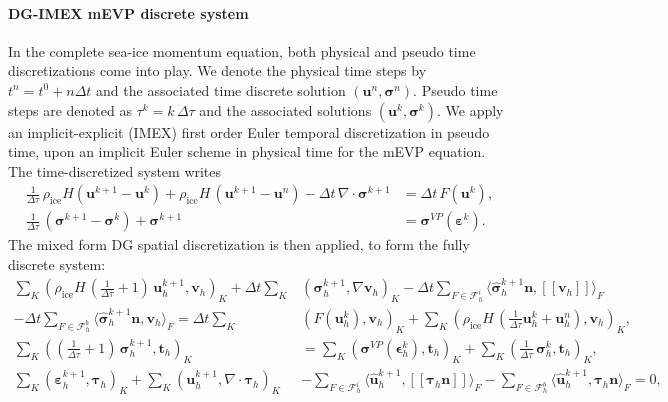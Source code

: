 \documentclass[11pt]{article}
\newcommand{\bu}{\mathbf{u}}
\newcommand{\bt}{\mathbf{t}}
\newcommand{\sig}{\boldsymbol{\sigma}}
\newcommand{\beps}{\boldsymbol{\varepsilon}}
\newcommand{\ljp}{ [\![ }
\newcommand{\rjp}{ ]\!] }
\begin{document}
\paragraph{DG-IMEX mEVP discrete system}
In the complete sea-ice momentum equation, both physical and pseudo time discretizations come into play. We denote the physical time steps by $t^n=t^0 + n \Delta t$ and the associated time discrete solution $(\bu^n, \sig^n)$. Pseudo time steps are denoted as $\tau^k = k \, \Delta \tau$ and the associated solutions $(\bu^k, \sig^k)$. We apply an implicit-explicit (IMEX) first order Euler temporal discretization in pseudo time, upon an implicit Euler scheme in physical time for the mEVP equation. The time-discretized system writes
%
\begin{equation}
\begin{aligned}
  \frac{1}{\Delta \tau}\,\rho_\text{ice}H(\bu^{k+1} - \bu^k)
  + \rho_{\mathrm{ice}} H\,(\bu^{k+1} - \bu^n)
  - \Delta t\, \nabla \cdot \sig^{k+1} &= \Delta t\, F(\bu^k),\\
  \frac{1}{\Delta \tau}\,(\sig^{k+1} - \sig^k)
  + \sig^{k+1}
  &= \sig^{VP}(\beps^k).
  \end{aligned}
  \label{eq:mevp_momentum_full}
\end{equation}
%
The mixed form DG spatial discretization is then applied, to form the fully discrete system:
\begingroup
\small
\begin{subequations}
\begin{align}
\sum_{K} ( \rho_{\mathrm{ice}} H\,(\frac{1}{\Delta \tau}+1)\, \mathbf{u}_h^{k+1},\mathbf{v}_h)_K+ \Delta t \sum_{K}& (\boldsymbol{\sigma}_h^{k+1}, \nabla \mathbf{v}_h)_K -\Delta t\sum_{F \in \mathcal{F}_h^i} \langle \widehat{\boldsymbol{\sigma}}_h^{k+1} \mathbf{n}, \ljp \mathbf{v}_h  \rjp\rangle_{F}\nonumber \\
-\Delta t\sum_{F \in \mathcal{F}_h^b} \langle \widehat{\boldsymbol{\sigma}}_h^{k+1} \mathbf{n}, \mathbf{v}_h \rangle_{F}
= \Delta t \sum_{K} &(F(\bu_h^{k}), \mathbf{v}_h)_K + \sum_{K} (\rho_{\mathrm{ice}} H\,( \frac{1}{\Delta \tau} \mathbf{u}_h^{k} + \bu_h^n), \mathbf{v}_h)_K, \label{u line}
\\
\sum_K ((\frac{1}{\Delta\tau}+1) \,\boldsymbol{\sigma}_h^{k+1}, \bt_h)_K
&= \sum_K (\boldsymbol{\sigma}^{VP}(\mathbf{\epsilon}_h^{k}), \bt_h)_K + \sum_K (\frac{1}{\Delta\tau} \,\boldsymbol{\sigma}_h^{k}, \bt_h)_K,\label{sig line}\\
\sum_{K} (\beps_h^{k+1}, \boldsymbol{\tau}_h)_K
+ \sum_{K} (\bu_h^{k+1}, \nabla \cdot \boldsymbol{\tau}_h)_K 
&- \sum_{F \in \mathcal{F}_h^i} \langle \widehat{\mathbf{u}}_h^{k+1}, \ljp \boldsymbol{\tau}_h \mathbf{n} \rjp \rangle_{F} - \sum_{F \in \mathcal{F}_h^b} \langle \widehat{\mathbf{u}}_h^{k+1},  \boldsymbol{\tau}_h \mathbf{n} \rangle_{F}=0, \label{eps line}
\end{align}
\label{discrete mEVP system}
\end{subequations}
\end{document}
